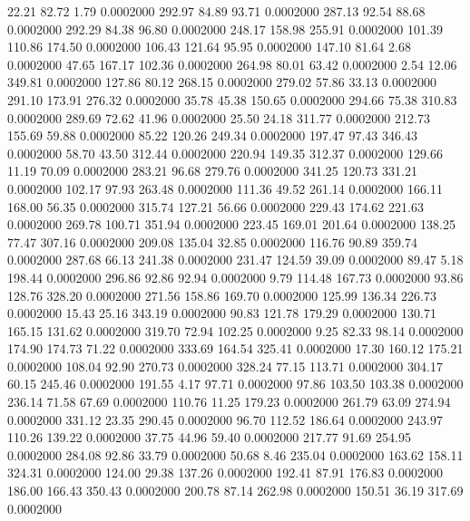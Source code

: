   22.21   82.72    1.79   0.0002000
 292.97   84.89   93.71   0.0002000
 287.13   92.54   88.68   0.0002000
 292.29   84.38   96.80   0.0002000
 248.17  158.98  255.91   0.0002000
 101.39  110.86  174.50   0.0002000
 106.43  121.64   95.95   0.0002000
 147.10   81.64    2.68   0.0002000
  47.65  167.17  102.36   0.0002000
 264.98   80.01   63.42   0.0002000
   2.54   12.06  349.81   0.0002000
 127.86   80.12  268.15   0.0002000
 279.02   57.86   33.13   0.0002000
 291.10  173.91  276.32   0.0002000
  35.78   45.38  150.65   0.0002000
 294.66   75.38  310.83   0.0002000
 289.69   72.62   41.96   0.0002000
  25.50   24.18  311.77   0.0002000
 212.73  155.69   59.88   0.0002000
  85.22  120.26  249.34   0.0002000
 197.47   97.43  346.43   0.0002000
  58.70   43.50  312.44   0.0002000
 220.94  149.35  312.37   0.0002000
 129.66   11.19   70.09   0.0002000
 283.21   96.68  279.76   0.0002000
 341.25  120.73  331.21   0.0002000
 102.17   97.93  263.48   0.0002000
 111.36   49.52  261.14   0.0002000
 166.11  168.00   56.35   0.0002000
 315.74  127.21   56.66   0.0002000
 229.43  174.62  221.63   0.0002000
 269.78  100.71  351.94   0.0002000
 223.45  169.01  201.64   0.0002000
 138.25   77.47  307.16   0.0002000
 209.08  135.04   32.85   0.0002000
 116.76   90.89  359.74   0.0002000
 287.68   66.13  241.38   0.0002000
 231.47  124.59   39.09   0.0002000
  89.47    5.18  198.44   0.0002000
 296.86   92.86   92.94   0.0002000
   9.79  114.48  167.73   0.0002000
  93.86  128.76  328.20   0.0002000
 271.56  158.86  169.70   0.0002000
 125.99  136.34  226.73   0.0002000
  15.43   25.16  343.19   0.0002000
  90.83  121.78  179.29   0.0002000
 130.71  165.15  131.62   0.0002000
 319.70   72.94  102.25   0.0002000
   9.25   82.33   98.14   0.0002000
 174.90  174.73   71.22   0.0002000
 333.69  164.54  325.41   0.0002000
  17.30  160.12  175.21   0.0002000
 108.04   92.90  270.73   0.0002000
 328.24   77.15  113.71   0.0002000
 304.17   60.15  245.46   0.0002000
 191.55    4.17   97.71   0.0002000
  97.86  103.50  103.38   0.0002000
 236.14   71.58   67.69   0.0002000
 110.76   11.25  179.23   0.0002000
 261.79   63.09  274.94   0.0002000
 331.12   23.35  290.45   0.0002000
  96.70  112.52  186.64   0.0002000
 243.97  110.26  139.22   0.0002000
  37.75   44.96   59.40   0.0002000
 217.77   91.69  254.95   0.0002000
 284.08   92.86   33.79   0.0002000
  50.68    8.46  235.04   0.0002000
 163.62  158.11  324.31   0.0002000
 124.00   29.38  137.26   0.0002000
 192.41   87.91  176.83   0.0002000
 186.00  166.43  350.43   0.0002000
 200.78   87.14  262.98   0.0002000
 150.51   36.19  317.69   0.0002000
